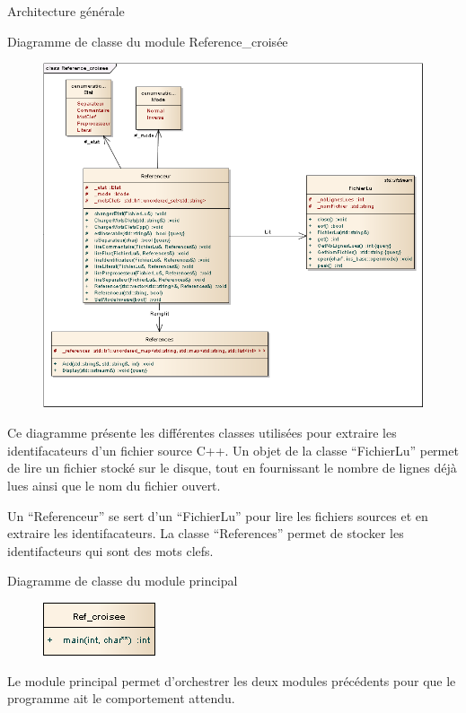 \documentclass{article}
\begin{document}
\begin{section}{Architecture générale}
   \begin{subsection}{Diagramme de classe du module Reference\_croisée}
    \begin{figure}[!ht]
      \begin{center}
	\includegraphics[scale=0.5]{./diagrammeClasse_reference.png}
      \end{center}
    \end{figure}
    \FloatBarrier
     Ce diagramme présente les différentes classes utilisées pour extraire les identifacateurs d'un fichier source C++.
      Un objet de la classe ``FichierLu'' permet de lire un fichier stocké sur le disque, tout en fournissant le nombre de lignes déjà 
      lues ainsi que le nom du fichier ouvert. 
      
      Un ``Referenceur'' se sert d'un ``FichierLu'' pour lire les fichiers sources et en extraire les identifacateurs.
      La classe ``References'' permet de stocker les identifacteurs qui sont des mots clefs.
   \end{subsection}
   
   \newpage
    \begin{subsection}{Diagramme de classe du module principal}
    \begin{figure}[!ht]
      \begin{center}
	\includegraphics[scale=0.5]{./diagrammeClasse_main.png}
      \end{center}
    \end{figure}
    \FloatBarrier
    Le module principal permet d'orchestrer les deux modules précédents pour que le programme ait le comportement attendu.
   \end{subsection}

\end{section}
\end{document}
